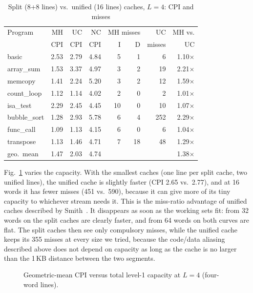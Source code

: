 \documentclass[conference]{IEEEtran}
\begin{document}
\begin{table}[t]
\caption{Split (8+8 lines) vs.\ unified (16 lines) caches, $L=4$: CPI and misses}
\label{tab:split}
\centering
\setlength{\tabcolsep}{2.6pt}
\begin{tabular}{lrrrrrrr}
\toprule
Program & MH & UC & NC & \multicolumn{2}{c}{MH misses} & UC & MH vs. \\
 & CPI & CPI & CPI & I & D & misses & UC \\
\midrule
basic        & 2.53 & 2.79 & 4.84 &  5 &  1 &   6 & 1.10$\times$ \\
array\_sum   & 1.53 & 3.37 & 4.97 &  3 &  2 &  19 & 2.21$\times$ \\
memcopy      & 1.41 & 2.24 & 5.20 &  3 &  2 &  12 & 1.59$\times$ \\
count\_loop  & 1.12 & 1.14 & 4.02 &  2 &  0 &   2 & 1.01$\times$ \\
isa\_test    & 2.29 & 2.45 & 4.45 & 10 &  0 &  10 & 1.07$\times$ \\
bubble\_sort & 1.28 & 2.93 & 5.78 &  6 &  4 & 252 & 2.29$\times$ \\
func\_call   & 1.09 & 1.13 & 4.15 &  6 &  0 &   6 & 1.04$\times$ \\
transpose    & 1.13 & 1.46 & 4.71 &  7 & 18 &  48 & 1.29$\times$ \\
\midrule
geo.\ mean   & 1.47 & 2.03 & 4.74 & \multicolumn{3}{c}{} & 1.38$\times$ \\
\bottomrule
\end{tabular}
\end{table}

Fig.~\ref{fig:size} varies the capacity. With the smallest caches (one line
per split cache, two unified lines), the unified cache is slightly faster
(CPI 2.65 vs.\ 2.77), and at 16 words it has fewer misses (451 vs.\ 590),
because it can give more of its tiny capacity to whichever stream needs it.
This is the miss-ratio advantage of unified caches described by
Smith~\cite{smith1982}. It disappears as soon as the working sets fit: from 32
words on the split caches are clearly faster, and from 64 words on both curves are
flat. The split caches then see only compulsory misses, while the unified
cache keeps its 355 misses at every size we tried, because the code/data
aliasing described above does not depend on capacity as long as the cache
is no larger than the 1\,KB distance between the two segments.

\begin{figure}[t]
\centering

\caption{Geometric-mean CPI versus total level-1 capacity at $L=4$ (four-word lines).}
\label{fig:size}
\end{figure}
\end{document}
